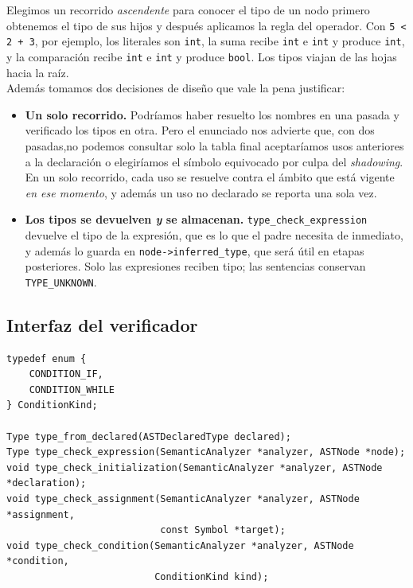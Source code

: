 \documentclass[12pt,letterpaper]{article}
\begin{document}
Elegimos un recorrido \emph{ascendente} para conocer el tipo de un nodo primero obtenemos el tipo de sus hijos
y después aplicamos la regla del operador. Con \texttt{5 < 2 + 3}, por ejemplo, los literales son \texttt{int},
la suma recibe \texttt{int} e \texttt{int} y produce \texttt{int}, y la comparación recibe \texttt{int} e
\texttt{int} y produce \texttt{bool}. Los tipos viajan de las hojas hacia la raíz.\\

Además tomamos dos decisiones de diseño que vale la pena justificar:

\begin{itemize}
\item \textbf{Un solo recorrido.} Podríamos haber resuelto los nombres en una pasada y verificado los tipos en
  otra. Pero el enunciado nos advierte que, con dos pasadas,no podemos consultar solo la tabla final aceptaríamos
  usos anteriores a la declaración o elegiríamos el símbolo equivocado por culpa del \emph{shadowing}. En un
  solo recorrido, cada uso se resuelve contra el ámbito que está vigente \emph{en ese momento}, y además un uso
  no declarado se reporta una sola vez.

\item \textbf{Los tipos se devuelven \emph{y} se almacenan.} \texttt{type\_check\_expression} devuelve el tipo
  de la expresión, que es lo que el padre necesita de inmediato, y además lo guarda en
  \texttt{node->inferred\_type}, que será útil en etapas posteriores. Solo las expresiones reciben tipo; las
  sentencias conservan \texttt{TYPE\_UNKNOWN}.
\end{itemize}

\subsection*{Interfaz del verificador}

\begin{lstlisting}[style=modernc, caption={Interfaz pública de \texttt{type\_checker.h}.}]
typedef enum {
    CONDITION_IF,
    CONDITION_WHILE
} ConditionKind;

Type type_from_declared(ASTDeclaredType declared);
Type type_check_expression(SemanticAnalyzer *analyzer, ASTNode *node);
void type_check_initialization(SemanticAnalyzer *analyzer, ASTNode *declaration);
void type_check_assignment(SemanticAnalyzer *analyzer, ASTNode *assignment,
                           const Symbol *target);
void type_check_condition(SemanticAnalyzer *analyzer, ASTNode *condition,
                          ConditionKind kind);
\end{lstlisting}
\end{document}
